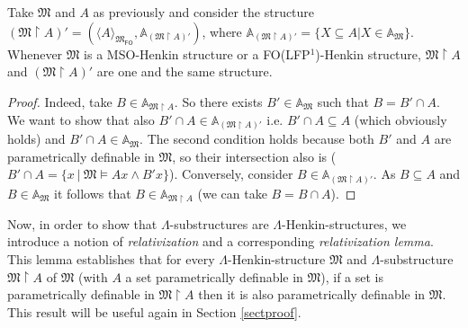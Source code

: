\documentclass{LMCS}
\newcommand{\frM}{\mathfrak{M}}
\newcommand{\fo}{\textsf{FO}\xspace}
\newcommand{\mso}{\textsf{MSO}\xspace}
\newcommand{\folfp}{\textsf{FO(LFP$^1$)}\xspace}
\begin{document}
\begin{prop}
Take $\frM$ and $A$ as previously and consider the structure
$(\frM \upharpoonright A)'=(\langle A \rangle_{\frM_\fo},
\mathbb{A}_{(\frM \upharpoonright A)'})$,
where
$\mathbb{A}_{(\frM \upharpoonright A)'}=\{X \subseteq A | X
    \in \mathbb{A}_\frM\}$. Whenever $\frM$ is a \mso-Henkin structure or a \folfp-Henkin structure, $\frM \upharpoonright A$ and $(\frM \upharpoonright A)'$ are one and the same structure.
\label{altsub}
\end{prop}
\begin{proof}
Indeed, take $B \in \mathbb{A}_{\frM \upharpoonright A}$. So there exists $B' \in \mathbb{A}_\frM$ such that $B=B' \cap A$. We want to show that also $B' \cap A \in \mathbb{A}_{(\frM \upharpoonright A)'}$ i.e. $B'\cap A \subseteq A$ (which obviously holds) and $B' \cap A\in \mathbb{A}_\frM$. The second condition holds because both $B'$ and $A$ are parametrically definable in $\frM$, so their intersection also is ($B' \cap A=\{x ~|~ \frM \models Ax \wedge B'x\}$). Conversely, consider $B \in \mathbb{A}_{(\frM \upharpoonright A)'}$. As
$B\subseteq A$ and $B\in \mathbb{A}_\frM$ it follows that $B \in \mathbb{A}_{\frM \upharpoonright A}$ (we can take $B=B \cap A$).
\end{proof}
Now, in order to show that $\Lambda$-substructures are $\Lambda$-Henkin-structures, we introduce a notion of \emph{relativization} and a corresponding \emph{relativization lemma}.  This lemma establishes that for every $\Lambda$-Henkin-structure $\frM$ and $\Lambda$-substructure $\frM \upharpoonright A$ of $\frM$ (with $A$ a set parametrically definable in $\frM$), if a set is parametrically definable in $\frM \upharpoonright A$ then it is also parametrically definable in $\frM$. This result will be useful again in Section \ref{sectproof}.
\end{document}
